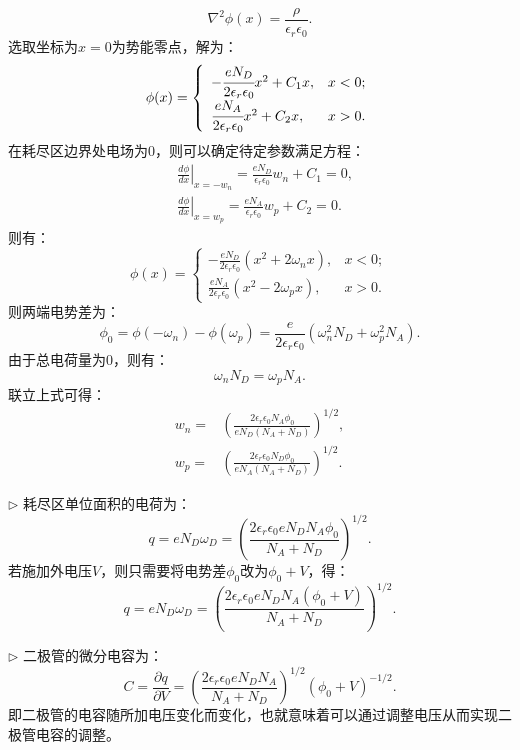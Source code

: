 \documentclass[reqno,a4paper,12pt]{amsart}
\begin{document}
\begin{enumerate}[1.]
\begin{tcolorbox}[breakable, colback = black!5!white, colframe = black]
\[
	\nabla^2 \phi(x) = \frac{\rho}{\epsilon_r\epsilon_0}.
\]
选取坐标为$x=0$为势能零点，解为：
\[
	\phi(x) = \left\{ \begin{array}{ll}
		-\cfrac{eN_D}{2\epsilon_r\epsilon_0}x^2 + C_1 x, & x<0; \\
		\cfrac{eN_A}{2\epsilon_r\epsilon_0}x^2 + C_2 x, & x>0.
	\end{array} \right.
\]
在耗尽区边界处电场为0，则可以确定待定参数满足方程：
\begin{align*}
	&\left. \frac{d\phi}{dx} \right\vert_{x=-w_n} = \frac{eN_D}{\epsilon_r\epsilon_0}w_n + C_1 = 0, \\
	&\left. \frac{d\phi}{dx} \right\vert_{x=w_p} = \frac{eN_A}{\epsilon_r\epsilon_0}w_p + C_2 = 0.
\end{align*}
则有：
\[
	\phi(x) = \left\{ \begin{array}{ll}
		-\frac{eN_D}{2\epsilon_r\epsilon_0}(x^2+2\omega_nx), & x<0; \\
		\frac{eN_A}{2\epsilon_r\epsilon_0}(x^2-2\omega_px), & x>0. 
	\end{array} \right.
\]
则两端电势差为：
\[
	\phi_0 = \phi(-\omega_n) - \phi(\omega_p) = \frac{e}{2\epsilon_r\epsilon_0} (\omega_n^2N_D + \omega_p^2N_A).
\]
由于总电荷量为0，则有：
\[
	\omega_nN_D = \omega_pN_A.
\]
联立上式可得：
\begin{align*}
	w_n =& \left( \frac{2\epsilon_r\epsilon_0 N_A\phi_0}{eN_D(N_A+N_D)} \right)^{1/2}, \\
	w_p =& \left( \frac{2\epsilon_r\epsilon_0 N_D\phi_0}{eN_A(N_A+N_D)} \right)^{1/2}.
\end{align*}

$\triangleright$ 耗尽区单位面积的电荷为：
\[
	q = eN_D\omega_D = \left( \frac{2\epsilon_r\epsilon_0 e N_DN_A \phi_0}{N_A+N_D} \right)^{1/2}.
\]
若施加外电压$V$，则只需要将电势差$\phi_0$改为$\phi_0+V$，得：
\[
	q = eN_D\omega_D = \left( \frac{2\epsilon_r\epsilon_0 e N_DN_A (\phi_0+V)}{N_A+N_D} \right)^{1/2}.
\]

$\triangleright$ 二极管的微分电容为：
\[
	C = \frac{\partial q}{\partial V} = \left( \frac{2\epsilon_r\epsilon_0 e N_DN_A}{N_A+N_D} \right)^{1/2}(\phi_0+V)^{-1/2}.
\]
即二极管的电容随所加电压变化而变化，也就意味着可以通过调整电压从而实现二极管电容的调整。
\end{tcolorbox}


\end{enumerate}
\end{document}
